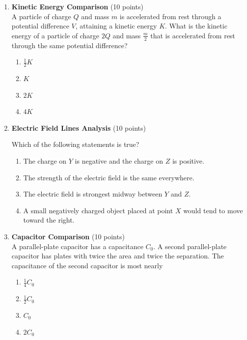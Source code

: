 \begin{enumerate}
  \item \textbf{Kinetic Energy Comparison} (10 points)\\
  A particle of charge $Q$ and mass $m$ is accelerated from rest through a potential difference $V$, attaining a kinetic energy $K$. What is the kinetic energy of a particle of charge $2Q$ and mass $\frac{m}{2}$ that is accelerated from rest through the same potential difference?
  \begin{enumerate}[label=(\Alph*)]
    \item $\frac{1}{2}K$
    \item $K$
    \item $2K$
    \item $4K$
  \end{enumerate}
  \begin{subanswer}
  \end{subanswer}

  \item \textbf{Electric Field Lines Analysis} (10 points)\\
  
  Which of the following statements is true?
  \begin{enumerate}[label=(\Alph*)]
    \item The charge on $Y$ is negative and the charge on $Z$ is positive.
    \item The strength of the electric field is the same everywhere.
    \item The electric field is strongest midway between $Y$ and $Z$.
    \item A small negatively charged object placed at point $X$ would tend to move toward the right.
  \end{enumerate}
  \begin{subanswer}
  \end{subanswer}

  \item \textbf{Capacitor Comparison} (10 points)\\
  A parallel-plate capacitor has a capacitance $C_0$. A second parallel-plate capacitor has plates with twice the area and twice the separation. The capacitance of the second capacitor is most nearly
  \begin{enumerate}[label=(\Alph*)]
    \item $\frac{1}{4}C_0$
    \item $\frac{1}{2}C_0$
    \item $C_0$
    \item $2C_0$
  \end{enumerate}
  \begin{subanswer}
  \end{subanswer}


\end{enumerate}
